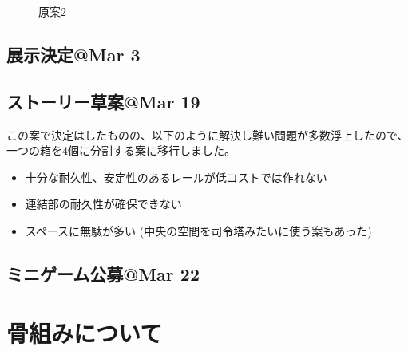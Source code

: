 \documentclass{jsarticle}
\begin{document}
\begin{figure}[htbp]
{        \label{fig:ミニゲーム}
    }
    \caption{原案2}
    \label{figs:原案2}
\end{figure}

\clearpage

\subsection{展示決定@Mar 3}
\subsection{ストーリー草案@Mar 19}

\clearpage

この案で決定はしたものの、以下のように解決し難い問題が多数浮上したので、一つの箱を4個に分割する案に移行しました。

\begin{itemize}
    \item 十分な耐久性、安定性のあるレールが低コストでは作れない
    \item 連結部の耐久性が確保できない
    \item スペースに無駄が多い (中央の空間を司令塔みたいに使う案もあった)
\end{itemize}

\subsection{ミニゲーム公募@Mar 22}

\section{骨組みについて}
\end{document}
